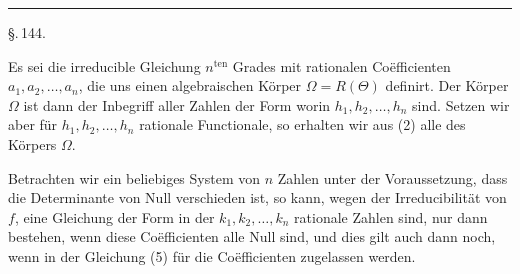 
\begin{center}


\rule{4cm}{0.4pt}

\S.\,144.


\end{center}

Es sei
die irreducible Gleichung $n^{\text{ten}}$ Grades mit rationalen Co\"efficienten $a_1, a_2, \ldots, a_n$, die uns einen algebraischen K\"orper $\Omega = R(\Theta)$ definirt. Der K\"orper $\Omega$ ist dann der Inbegriff aller Zahlen der Form
worin $h_1, h_2, \ldots, h_n$  sind. Setzen wir aber f\"ur $h_1, h_2, \ldots, h_n$ rationale Functionale, so erhalten wir aus (2) alle  des K\"orpers $\Omega$.

Betrachten wir ein beliebiges System von $n$ Zahlen
unter der Voraussetzung, dass die Determinante
von Null verschieden ist, so kann, wegen der Irreducibilit\"at von $f$, eine Gleichung der Form
in der $k_1, k_2, \ldots, k_n$ rationale Zahlen sind, nur dann bestehen, wenn diese Co\"efficienten alle Null sind, und dies gilt auch dann noch, wenn in der Gleichung (5) f\"ur die Co\"efficienten  zugelassen werden.
